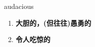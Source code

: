 
\begin{frame}
{\huge audacious}
\begin{center}
\begin{enumerate}\Large
  \item \textbf{大胆的，(但往往)愚勇的}
  \item \textbf{令人吃惊的}
\end{enumerate}
\end{center}
\end{frame}
